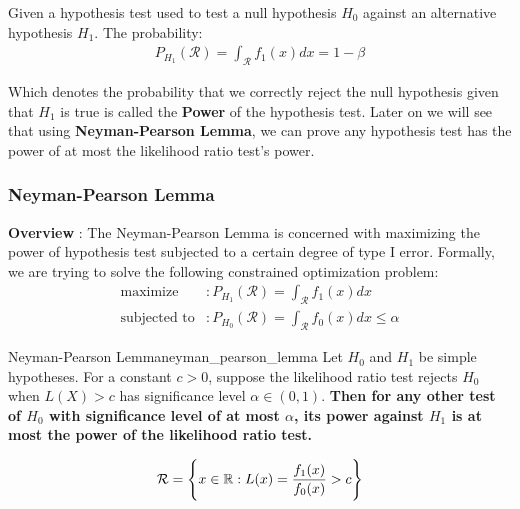 \begin{definition}
    Given a hypothesis test used to test a null hypothesis $H_0$ against an alternative hypothesis $H_1$. The probability:
    \begin{align*}
        P_{H_1}(\mathcal{R}) = \int_{\mathcal{R}} f_1(x)dx = 1 - \beta
    \end{align*}

    \noindent Which denotes the probability that we correctly reject the null hypothesis given that $H_1$ is true  is called the \textbf{Power} of the hypothesis test. Later on we will see that using \textbf{Neyman-Pearson Lemma}, we can prove any hypothesis test has the power of at most the likelihood ratio test's power. 
\end{definition}


\subsubsection{Neyman-Pearson Lemma}
\textbf{Overview} : The Neyman-Pearson Lemma is concerned with maximizing the power of hypothesis test subjected to a certain degree of type I error. Formally, we are trying to solve the following constrained optimization problem:
\begin{align*}
    \text{maximize} &: P_{H_1}(\mathcal{R}) = \int_\mathcal{R} f_1(x)dx 
    \\
    \text{subjected to} &: P_{H_0}(\mathcal{R}) = \int_\mathcal{R}f_0(x) dx \le \alpha
\end{align*}

\begin{theorem}{Neyman-Pearson Lemma}{neyman_pearson_lemma}
    Let $H_0$ and $H_1$ be simple hypotheses. For a constant $c>0$, suppose the likelihood ratio test rejects $H_0$ when $L(X) > c$ has significance level $\alpha\in(0,1)$. \textbf{Then for any other test of $H_0$ with significance level of at most $\alpha$, its power against $H_1$ is at most the power of the likelihood ratio test.}

    \begin{align*}
        \mathcal{R} = \Bigg\{ 
            x \in \mathbb{R} : L(x) = \frac{f_1(x)}{f_0(x)} > c
         \Bigg\}
    \end{align*}
\end{theorem}

